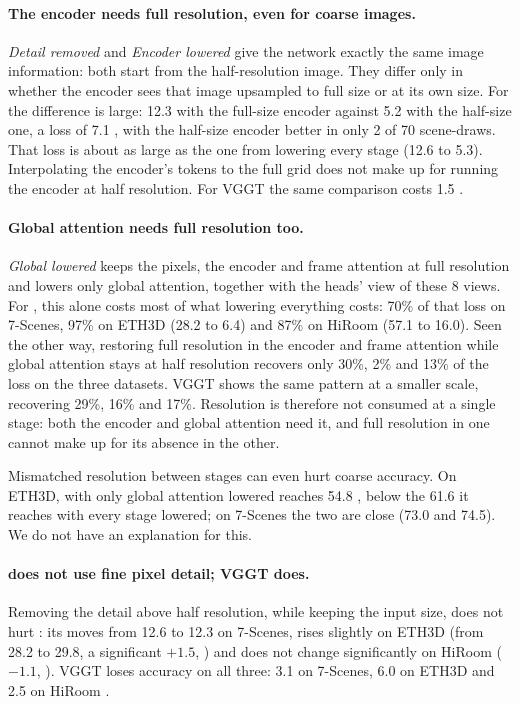 \paragraph{The encoder needs full resolution, even for coarse images.}
\emph{Detail removed} and \emph{Encoder lowered} give the network exactly the same image information: both start from the half-resolution image. They differ only in whether the encoder sees that image upsampled to full size or at its own size. For \pithree the difference is large: 12.3 \auc with the full-size encoder against 5.2 with the half-size one, a loss of 7.1 , with the half-size encoder better in only 2 of 70 scene-draws. That loss is about as large as the one from lowering every stage (12.6 to 5.3). Interpolating the encoder's tokens to the full grid does not make up for running the encoder at half resolution. For VGGT the same comparison costs 1.5 .

\paragraph{Global attention needs full resolution too.}
\emph{Global lowered} keeps the pixels, the encoder and frame attention at full resolution and lowers only global attention, together with the heads' view of these 8 views. For \pithree, this alone costs most of what lowering everything costs: 70\% of that loss on 7-Scenes, 97\% on ETH3D (28.2 to 6.4) and 87\% on HiRoom (57.1 to 16.0). Seen the other way, restoring full resolution in the encoder and frame attention while global attention stays at half resolution recovers only 30\%, 2\% and 13\% of the loss on the three datasets. VGGT shows the same pattern at a smaller scale, recovering 29\%, 16\% and 17\%. Resolution is therefore not consumed at a single stage: both the encoder and global attention need it, and full resolution in one cannot make up for its absence in the other.

Mismatched resolution between stages can even hurt coarse accuracy. On ETH3D, \pithree with only global attention lowered reaches 54.8 \aucc, below the 61.6 it reaches with every stage lowered; on 7-Scenes the two are close (73.0 and 74.5). We do not have an explanation for this.

\paragraph{\pithree does not use fine pixel detail; VGGT does.}
Removing the detail above half resolution, while keeping the input size, does not hurt \pithree: its \auc moves from 12.6 to 12.3 on 7-Scenes, rises slightly on ETH3D (from 28.2 to 29.8, a significant $+1.5$, ) and does not change significantly on HiRoom ($-1.1$, ). VGGT loses accuracy on all three: 3.1 \auc on 7-Scenes, 6.0 on ETH3D  and 2.5 on HiRoom .

